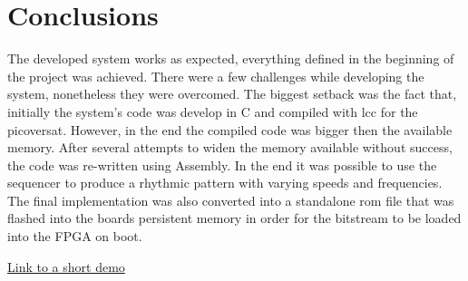 \section{Conclusions}
\label{sec:conc}

The developed system works as expected, everything defined in the beginning of the project was achieved. 
There were a few challenges while developing the system, nonetheless they were overcomed.
 The biggest setback was the fact that, initially the system's code was develop in C and compiled with lcc for
the picoversat. However, in the end the compiled code was bigger then the available memory. After several attempts to widen the memory
available without success, the code was re-written using Assembly. In the end it was possible to use the sequencer to produce a rhythmic pattern with varying speeds and frequencies.
The final implementation was also converted into a standalone rom file that was flashed into the boards persistent memory in order for the bitstream to be loaded into the FPGA on boot.

\href{https://bit.ly/36yPWnT
}{Link to a short demo}
